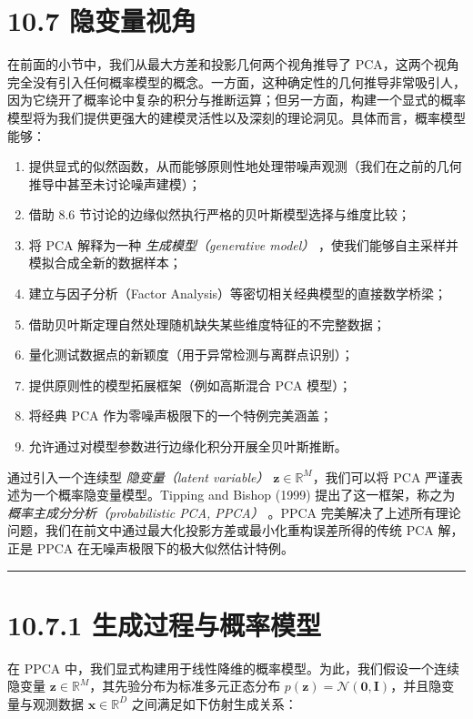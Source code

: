 \section*{10.7 隐变量视角}
\label{sec:10.7}

在前面的小节中，我们从最大方差和投影几何两个视角推导了 PCA，这两个视角完全没有引入任何概率模型的概念。一方面，这种确定性的几何推导非常吸引人，因为它绕开了概率论中复杂的积分与推断运算；但另一方面，构建一个显式的概率模型将为我们提供更强大的建模灵活性以及深刻的理论洞见。具体而言，概率模型能够：

\begin{enumerate}
\item 提供显式的似然函数，从而能够原则性地处理带噪声观测（我们在之前的几何推导中甚至未讨论噪声建模）；
\item 借助 8.6 节讨论的边缘似然执行严格的贝叶斯模型选择与维度比较；
\item 将 PCA 解释为一种 \emph{生成模型（generative model）} ，使我们能够自主采样并模拟合成全新的数据样本；
\item 建立与因子分析（Factor Analysis）等密切相关经典模型的直接数学桥梁；
\item 借助贝叶斯定理自然处理随机缺失某些维度特征的不完整数据；
\item 量化测试数据点的新颖度（用于异常检测与离群点识别）；
\item 提供原则性的模型拓展框架（例如高斯混合 PCA 模型）；
\item 将经典 PCA 作为零噪声极限下的一个特例完美涵盖；
\item 允许通过对模型参数进行边缘化积分开展全贝叶斯推断。
\end{enumerate}

通过引入一个连续型 \emph{隐变量（latent variable）} $ \boldsymbol{z} \in \mathbb{R}^M $，我们可以将 PCA 严谨表述为一个概率隐变量模型。Tipping and Bishop (1999) 提出了这一框架，称之为 \emph{概率主成分分析（probabilistic PCA, PPCA）} 。PPCA 完美解决了上述所有理论问题，我们在前文中通过最大化投影方差或最小化重构误差所得的传统 PCA 解，正是 PPCA 在无噪声极限下的极大似然估计特例。

\medskip\hrule\medskip

\section*{10.7.1 生成过程与概率模型}

在 PPCA 中，我们显式构建用于线性降维的概率模型。为此，我们假设一个连续隐变量 $ \boldsymbol{z} \in \mathbb{R}^M $，其先验分布为标准多元正态分布 $ p(\boldsymbol{z}) = \mathcal{N}(\boldsymbol{0}, \boldsymbol{I}) $，并且隐变量与观测数据 $ \boldsymbol{x} \in \mathbb{R}^D $ 之间满足如下仿射生成关系：

